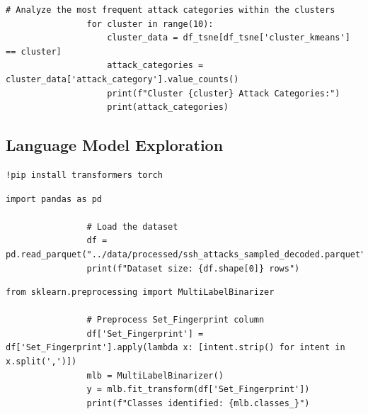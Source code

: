             \vspace{0.5em}

            \begin{lstlisting}[caption={Attack Categories Analysis by Cluster}, label={lst:attack_categories}]
                # Analyze the most frequent attack categories within the clusters
                for cluster in range(10):
                    cluster_data = df_tsne[df_tsne['cluster_kmeans'] == cluster]
                    attack_categories = cluster_data['attack_category'].value_counts()
                    print(f"Cluster {cluster} Attack Categories:")
                    print(attack_categories)
            \end{lstlisting}
            
            \vspace{0.5em}

        \subsection{Language Model Exploration}
        
            \vspace{0.5em}

            \begin{lstlisting}[language=bash, caption={Install required packages}, label={lst:install_packages}]
                !pip install transformers torch
            \end{lstlisting} 
            
            \vspace{0.5em}
            
            \begin{lstlisting}[caption={Load dataset and print its size}, label={lst:load_dataset}]
                import pandas as pd

                # Load the dataset
                df = pd.read_parquet("../data/processed/ssh_attacks_sampled_decoded.parquet")
                print(f"Dataset size: {df.shape[0]} rows")
            \end{lstlisting}
            
            \vspace{0.5em}
            
            \begin{lstlisting}[caption={Preprocess `Set\_Fingerprint` column}, label={lst:preprocess-fingerprint}]
                from sklearn.preprocessing import MultiLabelBinarizer

                # Preprocess Set_Fingerprint column
                df['Set_Fingerprint'] = df['Set_Fingerprint'].apply(lambda x: [intent.strip() for intent in x.split(',')])
                mlb = MultiLabelBinarizer()
                y = mlb.fit_transform(df['Set_Fingerprint'])
                print(f"Classes identified: {mlb.classes_}")
            \end{lstlisting}
            
